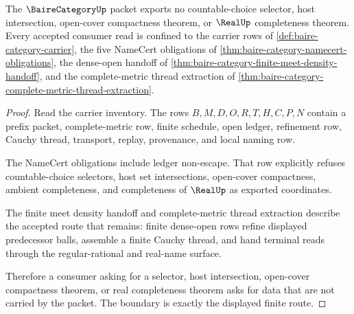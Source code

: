 \begin{theorem}
\label{thm:baire-category-countable-choice-boundary}
The $\BaireCategoryUp$ packet exports no countable-choice selector, host intersection, open-cover compactness theorem, or $\RealUp$ completeness theorem. Every accepted consumer read is confined to the carrier rows of \autoref{def:baire-category-carrier}, the five NameCert obligations of \autoref{thm:baire-category-namecert-obligations}, the dense-open handoff of \autoref{thm:baire-category-finite-meet-density-handoff}, and the complete-metric thread extraction of \autoref{thm:baire-category-complete-metric-thread-extraction}.
\end{theorem}
\begin{proof}
Read the carrier inventory. The rows $B,M,D,O,R,T,H,C,P,N$ contain a prefix packet, complete-metric row, finite schedule, open ledger, refinement row, Cauchy thread, transport, replay, provenance, and local naming row.

The NameCert obligations include ledger non-escape. That row explicitly refuses countable-choice selectors, host set intersections, open-cover compactness, ambient completeness, and completeness of $\RealUp$ as exported coordinates.

The finite meet density handoff and complete-metric thread extraction describe the accepted route that remains: finite dense-open rows refine displayed predecessor balls, assemble a finite Cauchy thread, and hand terminal reads through the regular-rational and real-name surface.

Therefore a consumer asking for a selector, host intersection, open-cover compactness theorem, or real completeness theorem asks for data that are not carried by the packet. The boundary is exactly the displayed finite route.
\end{proof}

